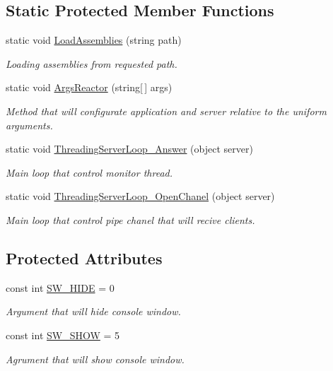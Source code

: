 \subsection*{Static Protected Member Functions}
\begin{DoxyCompactItemize}
\item 
static void \mbox{\hyperlink{class_uniform_server_1_1_base_server_a22b92ad517cd1003fe4fe3c86d857169}{Load\+Assemblies}} (string path)
\begin{DoxyCompactList}\small\item\em Loading assemblies from requested path. \end{DoxyCompactList}\item 
static void \mbox{\hyperlink{class_uniform_server_1_1_base_server_a992660752da60019c348e18226a87bf2}{Args\+Reactor}} (string\mbox{[}$\,$\mbox{]} args)
\begin{DoxyCompactList}\small\item\em Method that will configurate application and server relative to the uniform arguments. \end{DoxyCompactList}\item 
static void \mbox{\hyperlink{class_uniform_server_1_1_base_server_a6f6857c6f0644118294fa56c92f00e5c}{Threading\+Server\+Loop\+\_\+\+Answer}} (object server)
\begin{DoxyCompactList}\small\item\em Main loop that control monitor thread. \end{DoxyCompactList}\item 
static void \mbox{\hyperlink{class_uniform_server_1_1_base_server_a9e42ffc373c7fa23f401957251b0943d}{Threading\+Server\+Loop\+\_\+\+Open\+Chanel}} (object server)
\begin{DoxyCompactList}\small\item\em Main loop that control pipe chanel that will recive clients. \end{DoxyCompactList}\end{DoxyCompactItemize}
\subsection*{Protected Attributes}
\begin{DoxyCompactItemize}
\item 
const int \mbox{\hyperlink{class_uniform_server_1_1_base_server_aaff91507b262d2a1b9021caa2d01640f}{S\+W\+\_\+\+H\+I\+DE}} = 0
\begin{DoxyCompactList}\small\item\em Argument that will hide console window. \end{DoxyCompactList}\item 
const int \mbox{\hyperlink{class_uniform_server_1_1_base_server_a494087cabc03c54c3dc0ac1cc1048860}{S\+W\+\_\+\+S\+H\+OW}} = 5
\begin{DoxyCompactList}\small\item\em Agrument that will show console window. \end{DoxyCompactList}\end{DoxyCompactItemize}
